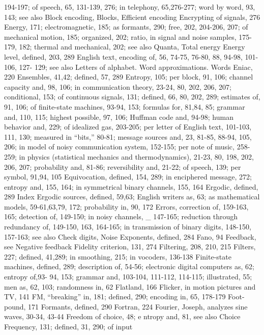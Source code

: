 {{{{{{{{{{{{{{{194-197; of speech, 65, 131-139,
276; in telephony, 65,276-277; word
by word, 93, 143; see also Block
encoding, Blocks, Efficient encoding
Encrypting of signals, 276
Energy, 171; electromagnetic, 185; as
formants, 290; free, 202, 204-206,
207; of mechanical motion, 185;
organized, 202; ratio, in signal and
noise samples, 175-179, 182; thermal
and mechanical, 202; see also
Quanta, Total energy
Energy level, defined, 203, 289
English text, encoding of, 56, 74-75,
76-80, 88, 94-98, 101-106, 127-
129; see also Letters of alphabet.
Word approximations. Words
Eniac, 220
Ensembles, 41,42; defined, 57, 289
Entropy, 105; per block, 91, 106; channel
capacity and, 98, 106; in communication
theory, 23-24, 80, 202,
206, 207; conditional, 153; of continuous
signals, 131; defined, 66,
80, 202, 289; estimates of, 91, 106;
of finite-state machines, 93-94, 153;
formulas for, 81,84, 85; grammar
and, 110, 115; highest possible, 97,
106; Huffman code and, 94-98;
human behavior and, 229; of
idealized gas, 203-205; per letter of
English text, 101-103, 111, 130;
measured in “bits,” 80-81; message
sources and, 23, 81-85, 88-94, 105,
206; in model of noisy communication
system, 152-155; per note of
music, 258-259; in physics (statistical
mechanics and thermodynamics),
21-23, 80, 198, 202, 206, 207;
probability and, 81-86; reversibility
and, 21-22; of speech, 139; per
symbol, 91,94, 105
Equivocation, defined, 154, 289; in
enciphered message, 272; entropy
and, 155, 164; in symmetrical
binary channels, 155, 164
Ergodic, defined, 289
Index
Ergodic sources, defined, 59,63; English
writers as, 63; as mathematical
models, 59-61,63,79, 172; probability
in, 90, 172
Errors, correction of, 159-163, 165;
detection of, 149-150; in noisy
channels, _ 147-165; reduction
through redundancy of, 149-150,
163, 164-165; in transmission of
binary digits, 148-150, 157-163;
see also Check digits, Noise
Exponents, defined, 284
Fano, 94
Feedback, see Negative feedback
Fidelity criterion, 131, 274
Filtering, 208, 210, 215
Filters, 227; defined, 41,289; in smoothing,
215; in vocoders, 136-138
Finite-state machines, defined, 289; description
of, 54-56; electronic digital
computers as, 62; entropy of,93-
94, 153; grammar and, 103-104,
111-112, 114-115; illustrated, 55;
men as, 62, 103; randomness in, 62
Flatland, 166
Flicker, in motion pictures and TV, 141
FM, “breaking” in, 181; defined, 290;
encoding in, 65, 178-179
Foot-pound, 171
Formants, defined, 290
Fortran, 224
Fourier, Joseph, analyzes sine waves,
30-34, 43-44
Freedom of choice, 48; e ntropy and, 81,
see also Choice
Frequency, 131; defined, 31, 290; of input
}}}}}}}}}}}}}}}
